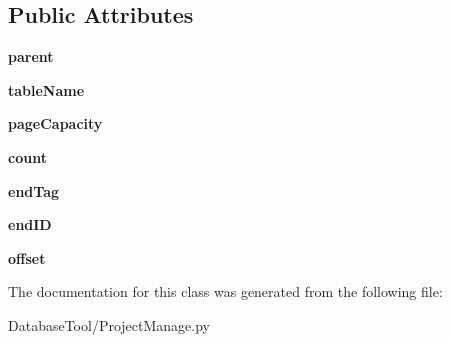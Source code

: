 \subsection*{Public Attributes}
\begin{DoxyCompactItemize}
\item 
\mbox{\label{classMIS_1_1DatabaseTool_1_1ProjectManage_1_1Cormis__DataIterator_adfce8310a811c1684649504bc694862e}} 
{\bfseries parent}
\item 
\mbox{\label{classMIS_1_1DatabaseTool_1_1ProjectManage_1_1Cormis__DataIterator_ad2582d7fa3eb8d600d5138376ae2b6cd}} 
{\bfseries table\+Name}
\item 
\mbox{\label{classMIS_1_1DatabaseTool_1_1ProjectManage_1_1Cormis__DataIterator_a2f143e1016064a6600b1b61eea562cda}} 
{\bfseries page\+Capacity}
\item 
\mbox{\label{classMIS_1_1DatabaseTool_1_1ProjectManage_1_1Cormis__DataIterator_accb39572d7f4c6351a63a6e642cf8c5c}} 
{\bfseries count}
\item 
\mbox{\label{classMIS_1_1DatabaseTool_1_1ProjectManage_1_1Cormis__DataIterator_a1150b3e034b092f3e7da9caa0dc99234}} 
{\bfseries end\+Tag}
\item 
\mbox{\label{classMIS_1_1DatabaseTool_1_1ProjectManage_1_1Cormis__DataIterator_a86c441c527213ce4366a4dde3d1bf194}} 
{\bfseries end\+ID}
\item 
\mbox{\label{classMIS_1_1DatabaseTool_1_1ProjectManage_1_1Cormis__DataIterator_a0eaa821d82ec97c0296b9460c958f6a0}} 
{\bfseries offset}
\end{DoxyCompactItemize}


The documentation for this class was generated from the following file\+:\begin{DoxyCompactItemize}
\item 
Database\+Tool/Project\+Manage.\+py\end{DoxyCompactItemize}
